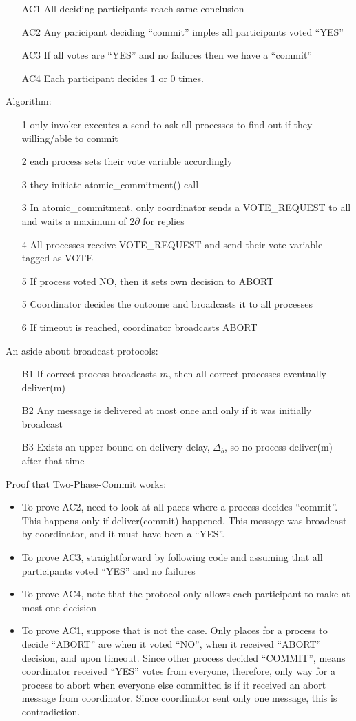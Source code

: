 \documentclass[a4paper,10pt,]{article}
\begin{document}
\begin{itemize}
  \item[AC1] All deciding participants reach same conclusion
  \item[AC2] Any paricipant deciding ``commit'' imples all participants voted ``YES''
  \item[AC3] If all votes are ``YES'' and no failures then we have a ``commit''
  \item[AC4] Each participant decides 1 or 0 times.
\end{itemize}
Algorithm:
\begin{itemize}
  \item[1] only invoker executes a send to ask all processes to find out if they willing/able to commit
  \item[2] each process sets their vote variable accordingly
  \item[3] they initiate atomic_commitment() call
  \item[3] In atomic_commitment, only coordinator sends a VOTE_REQUEST to all and waits a maximum of $2\partial$ for replies
  \item[4] All processes receive VOTE_REQUEST and send their vote variable tagged as VOTE
  \item[5] If process voted NO, then it sets own decision to ABORT
  \item[5] Coordinator decides the outcome and broadcasts it to all processes
  \item[6] If timeout is reached, coordinator broadcasts ABORT
\end{itemize}
An aside about broadcast protocols:
\begin{itemize}
  \item[B1] If correct process broadcasts $m$, then all correct processes eventually deliver(m)
  \item[B2] Any message is delivered at most once and only if it was initially broadcast
  \item[B3] Exists an upper bound on delivery delay, $\Delta_b$, so no process deliver(m) after that time
\end{itemize}
Proof that Two-Phase-Commit works:  
\begin{itemize}
  \item To prove AC2, need to look at all paces where a process decides ``commit''.  This happens only if deliver(commit) happened.  This message was broadcast by coordinator, and it must have been a ``YES''.  
  \item To prove AC3, straightforward by following code and assuming that all participants voted ``YES'' and no failures
  \item To prove AC4, note that the protocol only allows each participant to make at most one decision
  \item To prove AC1, suppose that is not the case.  Only places for a process to decide ``ABORT'' are when it voted ``NO'', when it received ``ABORT'' decision, and upon timeout.  Since other process decided ``COMMIT'', means coordinator received ``YES'' votes from everyone, therefore, only way for a process to abort when everyone else committed is if it received an abort message from coordinator.  Since coordinator sent only one message, this is contradiction.
\end{itemize}
\end{document}
